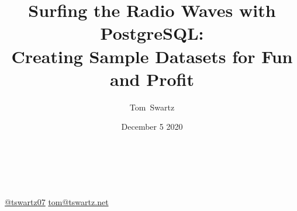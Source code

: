 \documentclass[aspectratio=169]{beamer}
\title{Surfing the Radio Waves with PostgreSQL: \\ Creating Sample Datasets for Fun and Profit}
\author[Swartz]{Tom~Swartz}
\institute{Central PA Open Source Conference 2020}
\date{December 5 2020}
\begin{document}
{
\begin{frame}[plain]
    \begin{TitleBox}
        \begin{center}
            {\color{red}\Large\inserttitle\color{black}}\\
        \end{center}
        \insertauthor{}\hfill\insertinstitute{}\\
        {\footnotesize
        \href{http://twitter.com/tswartz07}{@tswartz07}
        \hfill
        \href{mailto: tom@tswartz.net}{tom@tswartz.net}
        }
    \end{TitleBox}
    \vspace{15em}
\end{frame}}
\end{document}
